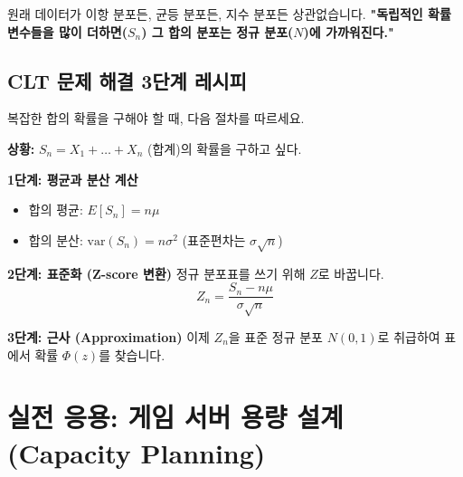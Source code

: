 \documentclass[11pt,a4paper]{book}
\theoremstyle{definition}
\begin{document}
\begin{conceptbox}[title={모든 길은 정규 분포로 통한다}]
원래 데이터가 이항 분포든, 균등 분포든, 지수 분포든 상관없습니다.
\textbf{"독립적인 확률 변수들을 많이 더하면($S_n$) 그 합의 분포는 정규 분포($N$)에 가까워진다."}
\end{conceptbox}


\subsection{CLT 문제 해결 3단계 레시피}
복잡한 합의 확률을 구해야 할 때, 다음 절차를 따르세요.

\begin{mathstep}[title={표준화(Standardization) 후 근사}]
\textbf{상황:} $S_n = X_1 + \dots + X_n$ (합계)의 확률을 구하고 싶다.

\textbf{1단계: 평균과 분산 계산}
\begin{itemize}
    \item 합의 평균: $E[S_n] = n\mu$
    \item 합의 분산: $\text{var}(S_n) = n\sigma^2$ (표준편차는 $\sigma\sqrt{n}$)
\end{itemize}

\textbf{2단계: 표준화 (Z-score 변환)}
정규 분포표를 쓰기 위해 $Z$로 바꿉니다.
\[ Z_n = \frac{S_n - n\mu}{\sigma\sqrt{n}} \]

\textbf{3단계: 근사 (Approximation)}
이제 $Z_n$을 표준 정규 분포 $N(0, 1)$로 취급하여 표에서 확률 $\Phi(z)$를 찾습니다.
\end{mathstep}

\section{실전 응용: 게임 서버 용량 설계 (Capacity Planning)}
\end{document}
